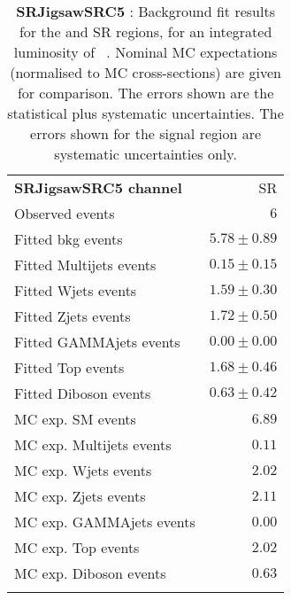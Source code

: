 

\begin{table}
\begin{center}
\setlength{\tabcolsep}{0.0pc}
{\tiny
\begin{tabular*}{\textwidth}{@{\extracolsep{\fill}}lr}
\noalign{\smallskip}\hline\noalign{\smallskip}
{\bf SRJigsawSRC5 channel}           & SR              \\[-0.05cm]
\noalign{\smallskip}\hline\noalign{\smallskip}
Observed events          & $6$                    \\
\noalign{\smallskip}\hline\noalign{\smallskip}
Fitted bkg events         & $5.78 \pm 0.89$              \\
\noalign{\smallskip}\hline\noalign{\smallskip}
        Fitted Multijets events         & $0.15 \pm 0.15$              \\
        Fitted Wjets events         & $1.59 \pm 0.30$              \\
        Fitted Zjets events         & $1.72 \pm 0.50$              \\
        Fitted GAMMAjets events         & $0.00 \pm 0.00$              \\
        Fitted Top events         & $1.68 \pm 0.46$              \\
        Fitted Diboson events         & $0.63 \pm 0.42$              \\
 \noalign{\smallskip}\hline\noalign{\smallskip}
MC exp. SM events              & $6.89$              \\
\noalign{\smallskip}\hline\noalign{\smallskip}
        MC exp. Multijets events         & $0.11$              \\
        MC exp. Wjets events         & $2.02$              \\
        MC exp. Zjets events         & $2.11$              \\
        MC exp. GAMMAjets events         & $0.00$              \\
        MC exp. Top events         & $2.02$              \\
        MC exp. Diboson events         & $0.63$              \\
\noalign{\smallskip}\hline\noalign{\smallskip}
\end{tabular*}
}
\end{center}
\caption{{\bf SRJigsawSRC5} : Background fit results for the  and SR regions, for an integrated luminosity of \ourintlumi~\ifb. Nominal MC expectations (normalised to MC cross-sections) are given for comparison. The errors shown are the statistical plus systematic uncertainties. The errors shown for the signal region are systematic uncertainties only.}
\label{table.results.systematics.in.logL.fit.SR.SRJigsawSRC5}
\end{table}
%